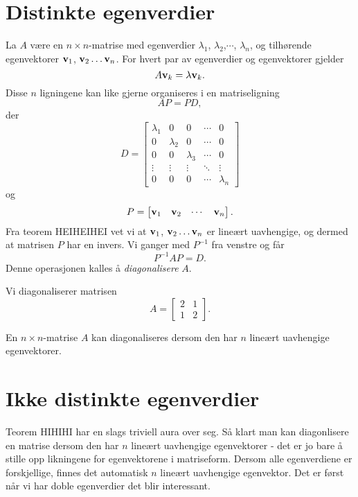 

\label{ch:diagonalisering}
\section*{Distinkte egenverdier}
La $A$ være en $n \times n$-matrise med egenverdier $\lambda_1$, $\lambda_2$,$\cdots$, $\lambda_n$, og tilhørende egenvektorer $\mathbf{v}_1$, $\mathbf{v}_2\dots \mathbf{v}_n$. For hvert par av egenverdier og egenvektorer gjelder
\[
A\mathbf{v}_k=\lambda \mathbf{v}_k.
\]
Disse $n$ ligningene kan like gjerne organiseres i en matriseligning
\[
AP=PD, 
\]
der 
\[
D=
\begin{bmatrix}
\lambda_1      & 0      & 0      & \cdots & 0 \\
0      & \lambda_2      & 0      & \cdots & 0 \\
0      & 0      & \lambda_3      & \cdots & 0 \\
\vdots & \vdots & \vdots & \ddots & \vdots \\
0      & 0      & 0      & \cdots & \lambda_n
\end{bmatrix}
\]
og 
\[
P=
\begin{bmatrix}
\mathbf{v}_1 & \mathbf{v}_2 & \cdots & \mathbf{v}_n
\end{bmatrix}.
\]
Fra teorem HEIHEIHEI vet vi at $\mathbf{v}_1$, $\mathbf{v}_2\dots \mathbf{v}_n$ er lineært uavhengige, og dermed at matrisen $P$ har en invers. Vi ganger med $P^{-1}$ fra venstre og får
\[
P^{-1}AP=D.
\]
Denne operasjonen kalles å \emph{diagonalisere} $A$. 

\begin{ex}	
Vi diagonaliserer matrisen 
\[
A=
\begin{bmatrix}
2     & 1 \\
1      & 2
\end{bmatrix}.
\]
\end{ex}

\begin{thm}
En $n \times n$-matrise $A$ kan diagonaliseres dersom den har $n$ lineært uavhengige egenvektorer.
\end{thm}

\section*{Ikke distinkte egenverdier}
Teorem HIHIHI har en slags triviell aura over seg. Så klart man kan diagonlisere en matrise dersom den har $n$ lineært uavhengige egenvektorer - det er jo bare å stille opp likningene for egenvektorene i matriseform. Dersom alle egenverdiene er forskjellige, finnes det automatisk $n$ lineært uavhengige egenvektor. Det er først når vi har doble egenverdier det blir interessant.

